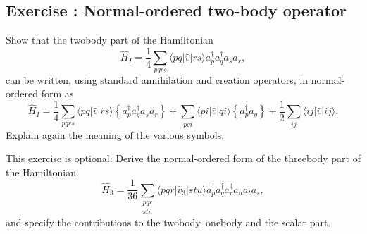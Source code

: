 \documentclass[graybox,sectrefs,envcountresetchap,open=right]{svmonodo}
\newenvironment{doconceexercise}{}{}
\newcounter{doconceexercisecounter}
\begin{document}
\begin{doconceexercise}

\subsection*{Exercise \thedoconceexercisecounter: Normal-ordered two-body operator}


Show that the twobody part of the Hamiltonian
\[
  \hat{H}_I = \frac{1}{4} \sum_{pqrs} \langle pq|\hat{v}|rs\rangle a^\dagger_p a^\dagger_q a_s  a_r,
\]
can be written, using standard annihilation and creation operators, in normal-ordered form as 
\[
\hat{H}_I =\frac{1}{4} \sum_{pqrs} \langle pq|\hat{v}|rs\rangle \left\{a^\dagger_p a^\dagger_q a_s  a_r\right\}
            + \sum_{pqi} \langle pi|\hat{v}|qi\rangle \left\{a^\dagger_p a_q\right\} 
            + \frac{1}{2} \sum_{ij}\langle ij|\hat{v}|ij\rangle.
\]
Explain again the meaning of the various symbols.

This exercise is optional: Derive the normal-ordered form of the threebody part of the Hamiltonian.
\[
\hat{H}_3 = \frac{1}{36} \sum_{\substack{pqr \\ stu}}
                 \langle pqr|\hat{v}_3|stu\rangle a^\dagger_p a^\dagger_q a^\dagger_r a_u a_t a_s,
\]
and specify the contributions to the twobody, onebody and the scalar part.

\end{doconceexercise}
\end{document}
